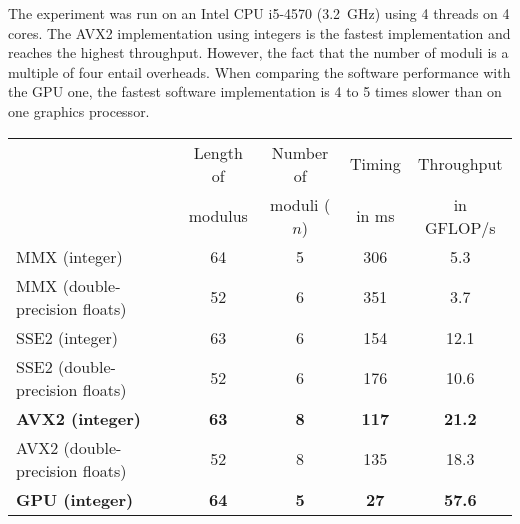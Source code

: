 \documentclass[runningheads,orivec]{llncs}
\begin{document}
The experiment was run on an Intel CPU i5-4570 (3.2~GHz) using 4 threads on 4 cores. The AVX2 implementation using integers is the fastest implementation and reaches the highest throughput. However, the fact that the number of moduli is a multiple of four entail overheads. When comparing the software performance with the GPU one, the fastest software implementation is 4 to 5 times slower than on one graphics processor. 

\vspace*{-0.25cm}



\begin{center}
    \begin{tabular}{|l||c|c|c|c|}
      \hline
        & \footnotesize Length of & \footnotesize Number of &  \footnotesize Timing & \footnotesize Throughput\\
	    & \footnotesize modulus & \footnotesize moduli ($n$) &  \footnotesize in ms & \footnotesize in GFLOP/s\\
      \hline
      \hline
      \footnotesize MMX (integer) & \footnotesize 64 & \footnotesize 5 & \footnotesize 306 & \footnotesize 5.3\\
      \footnotesize MMX (double-precision floats) & \footnotesize 52 & \footnotesize 6 & \footnotesize 351 & \footnotesize 3.7\\
      \footnotesize SSE2 (integer) & \footnotesize 63 & \footnotesize 6 & \footnotesize 154 & \footnotesize 12.1\\
\footnotesize SSE2 (double-precision floats) & \footnotesize 52 & \footnotesize 6 & \footnotesize 176 & \footnotesize 10.6\\
      \bf \footnotesize AVX2 (integer) & \bf \footnotesize 63 & \bf \footnotesize 8 & \bf \footnotesize 117 & \bf \footnotesize 21.2\\
      \footnotesize AVX2 (double-precision floats) & \footnotesize 52 & \footnotesize 8 & \footnotesize 135 & \footnotesize 18.3\\
      \bf \footnotesize GPU (integer) & \bf  \footnotesize 64 & \bf \footnotesize 5 & \bf  \footnotesize 27 & \bf \footnotesize 57.6\\

      \hline
    \end{tabular}
\end{center}


\vspace*{-0.5cm}
\end{document}
